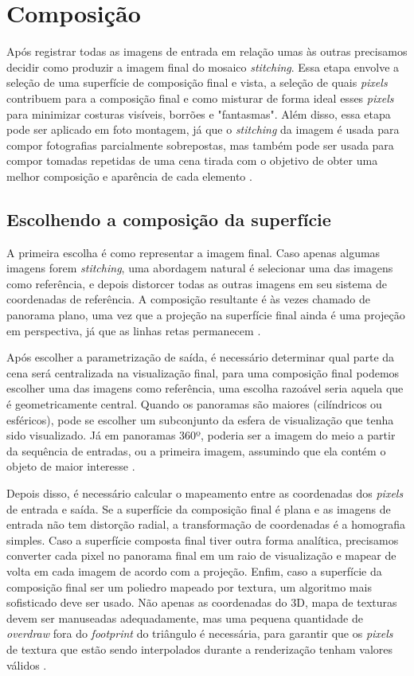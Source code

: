 \documentclass{article}
\begin{document}
\section{Composição}
Após registrar todas as imagens de entrada em relação umas às outras precisamos decidir como produzir a imagem final do mosaico \textit{stitching}. Essa etapa envolve a seleção de uma superfície de composição final e vista, a seleção de quais \textit{pixels} contribuem para a composição final e como misturar de forma ideal esses \textit{pixels} para minimizar costuras visíveis, borrões e "fantasmas". Além disso, essa etapa pode ser aplicado em foto montagem, já que o \textit{stitching} da imagem é usada para compor fotografias parcialmente sobrepostas, mas também pode ser usada para compor tomadas repetidas de uma cena tirada com o objetivo de obter uma melhor composição e aparência de cada elemento \cite{szeliski:2010}.

\subsection{Escolhendo a composição da superfície}
A primeira escolha é como representar a imagem final. Caso apenas algumas imagens forem \textit{stitching}, uma abordagem natural é selecionar uma das imagens como referência, e depois distorcer todas as outras imagens em seu sistema de coordenadas de referência. A composição resultante é às vezes chamado de panorama plano, uma vez que a projeção na superfície final ainda é uma projeção em perspectiva, já que as linhas retas permanecem \cite{szeliski:2010}.

Após escolher a parametrização de saída, é necessário determinar qual parte da cena será centralizada na visualização final, para uma composição final podemos escolher uma das imagens como referência, uma escolha razoável seria aquela que é geometricamente central. Quando os panoramas são maiores (cilíndricos ou esféricos), pode se escolher um subconjunto da esfera de visualização que tenha sido visualizado. Já em panoramas 360º, poderia ser a imagem do meio a partir da sequência de entradas, ou a primeira imagem, assumindo que ela contém o objeto de maior interesse \cite{szeliski:2010}.

Depois disso, é necessário calcular o mapeamento entre as coordenadas dos \textit{pixels} de entrada e saída. Se a superfície da composição final é plana e as imagens de entrada não tem distorção radial, a transformação de coordenadas é a homografia simples. Caso a superfície composta final tiver outra forma analítica, precisamos converter cada pixel no panorama final em um raio de visualização e mapear de volta em cada imagem de acordo com a projeção. Enfim, caso a superfície da composição final ser um poliedro mapeado por textura, um algoritmo mais sofisticado deve ser usado. Não apenas as coordenadas do 3D, mapa de texturas devem ser manuseadas adequadamente, mas uma pequena quantidade de \textit{overdraw} fora do \textit{footprint} do triângulo é necessária, para garantir que os \textit{pixels} de textura que estão sendo interpolados durante a renderização tenham valores válidos \cite{szeliski:2010}.
\end{document}
